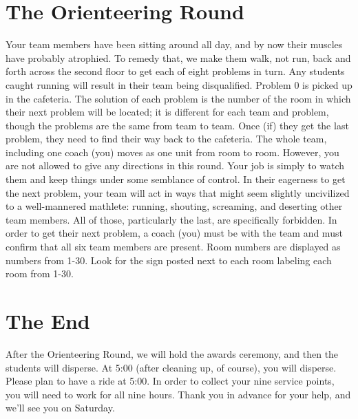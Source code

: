 \documentclass[11pt]{article}
\begin{document}
\begin{small}
\section{The Orienteering Round}
\noindent Your team members have been sitting around all day, and by now their muscles have probably atrophied. To remedy that, we make them walk, not run, back and forth across the second floor to get each of eight problems in turn. Any students caught running will result in their team being disqualified. Problem 0 is picked up in the cafeteria. The solution of each problem is the number of the room in which their next problem will be located; it is different for each team and problem, though the problems are the same from team to team. Once (if) they get the last problem, they need to find their way back to the cafeteria. The whole team, including one coach (you) moves as one unit from room to room. However, you are not allowed to give any directions in this round.  Your job is simply to watch them and keep things under some semblance of control.  In their eagerness to get the next problem, your team will act in ways that might seem slightly uncivilized to a well-mannered mathlete: running, shouting, screaming, and deserting other team members. All of those, particularly the last, are specifically forbidden. In order to get their next problem, a coach (you) must be with the team and must confirm that all six team members are present. Room numbers are displayed as numbers from 1-30. Look for the sign posted next to each room labeling each room from 1-30.

\section{The End}
\noindent After the Orienteering Round, we will hold the awards ceremony, and then the students will disperse. At 5:00 (after cleaning up, of course), you will disperse. Please plan to have a ride at 5:00. In order to collect your nine service points, you will need to work for all nine hours. Thank you in advance for your help, and we'll see you on Saturday.

\end{small}	
\end{document}
